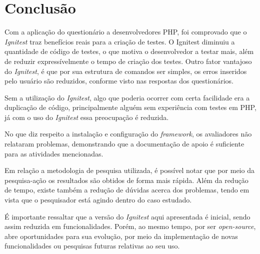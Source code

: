 \chapter{Conclusão}

  Com a aplicação do questionário a desenvolvedores PHP, foi comprovado que o \textit{Ignitest} traz benefícios reais para a criação de testes.
  O Ignitest diminuiu a quantidade de código de testes, o que motiva o desenvolvedor a testar mais, além de reduzir expressívelmente o tempo de criação dos testes.
  Outro fator vantajoso do \textit{Ignitest}, é que por sua estrutura de comandos ser simples, os erros inseridos pelo usuário são reduzidos, conforme visto nas respostas dos questionários.
  
  Sem a utilização do \textit{Ignitest}, algo que poderia ocorrer com certa facilidade era a duplicação de código, principalmente alguém sem experiência com testes em PHP, já com o uso do \textit{Ignitest} essa preocupação é reduzida.
  
  No que diz respeito a instalação e configuração do \textit{framework}, os avaliadores não relataram problemas, demonstrando que a documentação de apoio é suficiente para as atividades mencionadas.
  
  Em relação a metodologia de pesquisa utilizada, é possível notar que por meio da pesquisa-ação os resultados são obtidos de forma mais rápida. Além da redução de tempo, existe também a redução de dúvidas acerca dos problemas, tendo em vista que o pesquisador está agindo dentro do caso estudado.
  
  É importante ressaltar que a versão do \textit{Ignitest} aqui apresentada é inicial, sendo assim reduzida em funcionalidades. Porém, ao mesmo tempo, por ser \textit{open-source}, abre oportunidades para sua evolução, por meio da implementação de novas funcionalidades ou pesquisas futuras relativas ao seu uso.